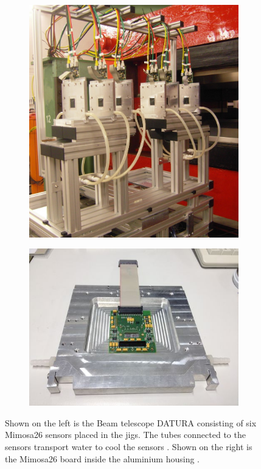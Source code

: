 \begin{figure}
  \begin{subfigure}{0.48\textwidth}
      \centering
      \includegraphics[height=0.82\textwidth]{images/telescope.jpg}
  \end{subfigure}
  \begin{subfigure}{0.48\textwidth}
      \hspace{-1cm}
      \includegraphics[height=0.82\textwidth]{images/mimosa.jpg}
  \end{subfigure}
  \caption{Shown on the left is the Beam telescope DATURA consisting of six Mimosa26 sensors placed in the jigs. The tubes connected to the sensors transport water to
  cool the sensors \cite{telescope}. Shown on the right is the Mimosa26 board inside the aluminium housing \cite{mimosa}. }
  \label{fig:telescope}
\end{figure}


